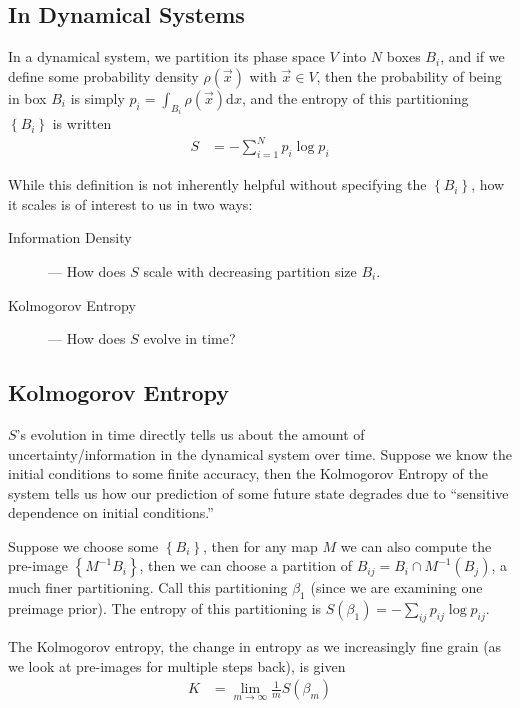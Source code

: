 \documentclass[12pt]{article}
\begin{document}
\subsection{In Dynamical Systems}

In a dynamical system, we partition its phase space $V$ into $N$ boxes $B_i$,
and if we define some probability density $\rho(\vec{x})$ with $\vec{x} \in V$,
then the probability of being in box $B_i$ is simply
$p_i = \int_{B_i}\rho(\vec{x})\mathrm{d}x$,
and the entropy of this partitioning
$\left\{ B_i \right\}$
is written
\begin{align}
    S &= -\sum\limits_{i=1}^{N}p_i\log p_i
\end{align}

While this definition is not inherently helpful without specifying the
$\left\{B_i\right\}$, how it scales is of interest to us in two ways:
\begin{description}
    \item[Information Density] --- How does $S$ scale with decreasing partition
        size $B_i$.
    \item[Kolmogorov Entropy] --- How does $S$ evolve in time?
\end{description}

\subsection{Kolmogorov Entropy}

$S$'s evolution in time directly tells us about the amount of
uncertainty/information in the dynamical system over time. Suppose we know the
initial conditions to some finite accuracy, then the Kolmogorov Entropy of the
system tells us how our prediction of some future state degrades due to
``sensitive dependence on initial conditions.''

Suppose we choose some $\left\{ B_i \right\}$, then for any map $M$ we can also
compute the pre-image $\left\{ M^{-1} B_i\right\}$, then we can choose a
partition of $B_{ij} = B_i \cap M^{-1}(B_j)$, a much finer partitioning. Call
this partitioning $\beta_1$ (since we are examining one preimage prior). The
entropy of this partitioning is
$S(\beta_1) = -\sum\limits_{ij}^{} p_{ij}\log p_{ij}$.

The Kolmogorov entropy, the change in entropy as we increasingly fine grain (as
we look at pre-images for multiple steps back), is given
\begin{align}
    K &= \lim_{m \to \infty} \frac{1}{m}S(\beta_m)
\end{align}
\end{document}
